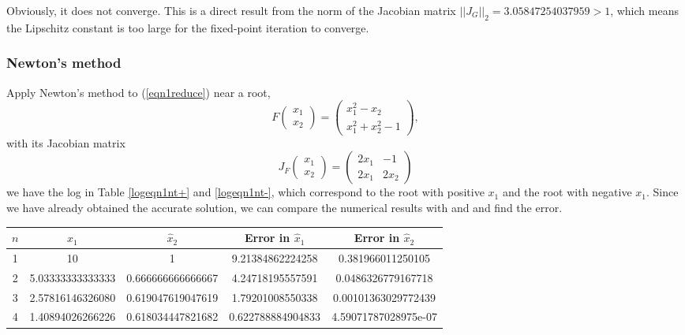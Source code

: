 \begin{table}[H]
\begin{table}[H]
Obviously, it does not converge.
This is a direct result from the norm of the Jacobian matrix \(||J_G||_2=3.05847254037959>1\), which means the Lipschitz constant is too large for the fixed-point iteration to converge.



\subsubsection{Newton's method}
Apply Newton's method to (\ref{eqn1reduce}) near a root,
\[ F\begin{pmatrix} x_1\\ x_2\end{pmatrix}=\begin{pmatrix} x_1^2-x_2 \\ x_1^2+x_2^2-1 \end{pmatrix}, \]
with its Jacobian matrix
\[ J_F\begin{pmatrix} x_1\\ x_2\end{pmatrix}=\begin{pmatrix} 2x_1 & -1 \\ 2x_1 & 2x_2 \end{pmatrix}\]
we have the log in Table \ref{logeqn1nt+} and \ref{logeqn1nt-}, which correspond to the root with positive \(x_1\) and the root with negative \(x_1\).
Since we have already obtained the accurate solution, we can compare the numerical results with and and find the error.
\ifnum{}
	\begin{table}[H]
\else
	\begin{table}[htbp]
\fi
	\centering
	\begin{subtable}[t]{\textwidth}
		\centering
		\begin{tabular}{|c|c|c|c|c|}
		\hline
		\(n\)	&	\(\hat{x}_1\)	&	\(\hat{x}_2\)	&	Error in \(\hat{x}_1\)	&	Error in \(\hat{x}_2\)		\\	\hline
		1	&	\footnotesize	10					&	\footnotesize	1					&	\footnotesize	9.21384862224258		&	\footnotesize	0.381966011250105		\\	\hline
		2	&	\footnotesize	5.03333333333333	&	\footnotesize	0.666666666666667	&	\footnotesize	4.24718195557591		&	\footnotesize	0.0486326779167718		\\	\hline
		3	&	\footnotesize	2.57816146326080	&	\footnotesize	0.619047619047619	&	\footnotesize	1.79201008550338		&	\footnotesize	0.00101363029772439		\\	\hline
		4	&	\footnotesize	1.40894026266226	&	\footnotesize	0.618034447821682	&	\footnotesize	0.622788884904833		&	\footnotesize	4.59071787028975e-07	\\	\hline

\end{tabular}
\end{subtable}
\end{table}
\end{table}
\end{table}
\end{table}
